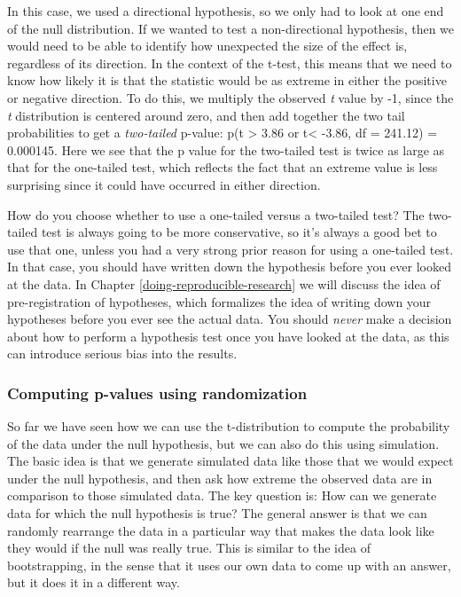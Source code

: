 \documentclass[
  12pt,
]{book}
\begin{document}
In this case, we used a directional hypothesis, so we only had to look at one end of the null distribution. If we wanted to test a non-directional hypothesis, then we would need to be able to identify how unexpected the size of the effect is, regardless of its direction. In the context of the t-test, this means that we need to know how likely it is that the statistic would be as extreme in either the positive or negative direction. To do this, we multiply the observed \emph{t} value by -1, since the \emph{t} distribution is centered around zero, and then add together the two tail probabilities to get a \emph{two-tailed} p-value: p(t \textgreater{} 3.86 or t\textless{} -3.86, df = 241.12) = 0.000145. Here we see that the p value for the two-tailed test is twice as large as that for the one-tailed test, which reflects the fact that an extreme value is less surprising since it could have occurred in either direction.

How do you choose whether to use a one-tailed versus a two-tailed test? The two-tailed test is always going to be more conservative, so it's always a good bet to use that one, unless you had a very strong prior reason for using a one-tailed test. In that case, you should have written down the hypothesis before you ever looked at the data. In Chapter \ref{doing-reproducible-research} we will discuss the idea of pre-registration of hypotheses, which formalizes the idea of writing down your hypotheses before you ever see the actual data. You should \emph{never} make a decision about how to perform a hypothesis test once you have looked at the data, as this can introduce serious bias into the results.

\hypertarget{computing-p-values-using-randomization}{%
\subsubsection{Computing p-values using randomization}\label{computing-p-values-using-randomization}}

So far we have seen how we can use the t-distribution to compute the probability of the data under the null hypothesis, but we can also do this using simulation. The basic idea is that we generate simulated data like those that we would expect under the null hypothesis, and then ask how extreme the observed data are in comparison to those simulated data. The key question is: How can we generate data for which the null hypothesis is true? The general answer is that we can randomly rearrange the data in a particular way that makes the data look like they would if the null was really true. This is similar to the idea of bootstrapping, in the sense that it uses our own data to come up with an answer, but it does it in a different way.
\end{document}

